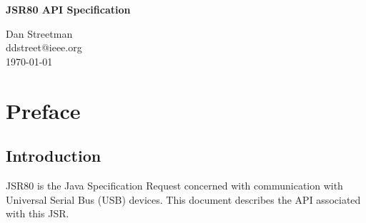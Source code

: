 \documentclass{article}
\newcommand{\mytitle}[0]{JSR80 API Specification}
\newcommand{\myauthor}[0]{Dan Streetman}
\newcommand{\mydate}[0]{\today}
\begin{document}
\pagestyle{empty}


%

\begin{titlepage}

\begin{center}
\Huge{\textbf{\mytitle}}
\end{center}

\vfill
\vfill

\begin{flushright}
\large{\myauthor}
\\
\large{ddstreet@ieee.org}
\\
\large{\mydate}
\end{flushright}

\vfill

\end{titlepage}

%

\pagestyle{fancy}
\fancyhf{}
\renewcommand{\sectionmark}[1]{\markright{\emph{\mytitle}}}
\renewcommand{\subsectionmark}[1]{\markright{\emph{\mytitle}}}
\renewcommand{\subsubsectionmark}[1]{\markright{\emph{\mytitle}}}
\fancyhead[LE,RO]{\bfseries\thepage}
\fancyhead[LO]{\rightmark}

%

\tableofcontents

\listoftables

\listoffigures

\pagebreak

%

\section{Preface}

\subsection{Introduction}

JSR80 is the Java Specification Request concerned with communication with
Universal Serial Bus (USB) devices.  This document describes the API associated
with this JSR.  

\mysubsectionend

%
%
%
%
%
\end{document}
